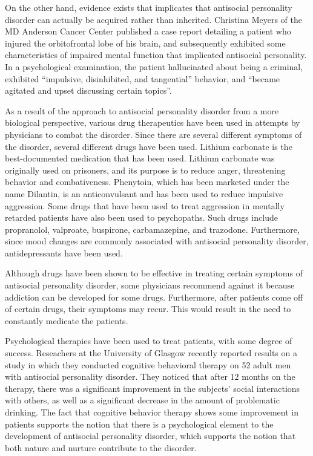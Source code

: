 On the other hand, evidence exists that implicates that antisocial personality disorder can actually be acquired rather than inherited. Christina Meyers of the MD Anderson Cancer Center published a case report detailing a patient who injured the orbitofrontal lobe of his brain, and subsequently exhibited some characteristics of impaired mental function that implicated antisocial personality. In a psychological examination, the patient hallucinated about being a criminal, exhibited “impulsive, disinhibited, and tangential” behavior, and “became agitated and upset discussing certain topics”. \cite{meyers} 
	
As a result of the approach to antisocial personality disorder from a more biological perspective, various drug therapeutics have been used in attempts by physicians to combat the disorder.  Since there are several different symptoms of the disorder, several different drugs have been used.  Lithium carbonate is the best-documented medication that has been used. Lithium carbonate was originally used on prisoners, and its purpose is to reduce anger, threatening behavior and combativeness. \cite{psychcentral} Phenytoin, which has been marketed under the name Dilantin, is an anticonvulsant and has been used to reduce impulsive aggression. Some drugs that have been used to treat aggression in mentally retarded patients have also been used to psychopaths. Such drugs include propranolol, valproate, buspirone, carbamazepine, and trazodone. \cite{psychcentral}Furthermore, since mood changes are commonly associated with antisocial personality disorder, antidepressants have been used. 
	
Although drugs have been shown to be effective in treating certain symptoms of antisocial personality disorder, some physicians recommend against it because addiction can be developed for some drugs. Furthermore, after patients come off of certain drugs, their symptoms may recur. This would result in the need to constantly medicate the patients.
	
Psychological therapies have been used to treat patients, with some degree of success. Reseachers at the University of Glasgow recently reported results on a study in which they conducted cognitive behavioral therapy on 52 adult men with antisocial personality disorder. They noticed that after 12 months on the therapy, there was a significant improvement in the subjects' social interactions with others, as well as a significant decrease in the amount of problematic drinking. \cite{davidson} The fact that cognitive behavior therapy shows some improvement in patients supports the notion that there is a psychological element to the development of antisocial personality disorder, which supports the notion that both nature and nurture contribute to the disorder.
	
